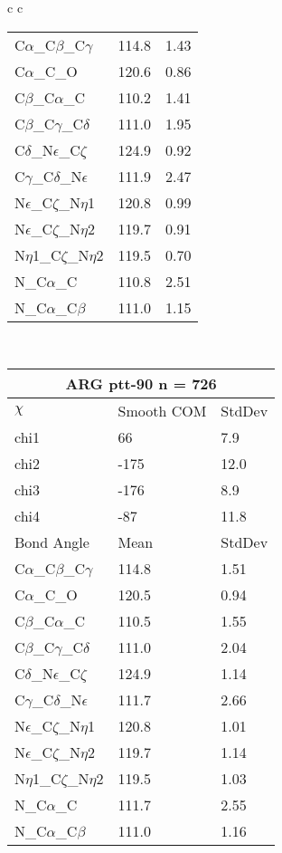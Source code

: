 \begin{longtable}{ c c }
\begin{tabular}{ l l l }
  C$\alpha$\_C$\beta$\_C$\gamma$ & 114.8 & 1.43\\
  C$\alpha$\_C\_O & 120.6 & 0.86\\
  C$\beta$\_C$\alpha$\_C & 110.2 & 1.41\\
  C$\beta$\_C$\gamma$\_C$\delta$ & 111.0 & 1.95\\
  C$\delta$\_N$\epsilon$\_C$\zeta$ & 124.9 & 0.92\\
  C$\gamma$\_C$\delta$\_N$\epsilon$ & 111.9 & 2.47\\
  N$\epsilon$\_C$\zeta$\_N$\eta$1 & 120.8 & 0.99\\
  N$\epsilon$\_C$\zeta$\_N$\eta$2 & 119.7 & 0.91\\
  N$\eta$1\_C$\zeta$\_N$\eta$2 & 119.5 & 0.70\\
  N\_C$\alpha$\_C & 110.8 & 2.51\\
  N\_C$\alpha$\_C$\beta$ & 111.0 & 1.15\\
  \bottomrule
  \end{tabular}
  \\
  \begin{tabular}{ l l l }
  \toprule
  \multicolumn{3}{c}{ARG \textbf{ptt-90} n = 726} \\ \toprule
  $\chi$       & Smooth COM & StdDev \\ \midrule
  chi1 & 66 & 7.9 \\ 
  chi2 & -175 & 12.0 \\ 
  chi3 & -176 & 8.9 \\ 
  chi4 & -87 & 11.8 \\ \midrule
  Bond Angle   & Mean     & StdDev \\ \midrule
  C$\alpha$\_C$\beta$\_C$\gamma$ & 114.8 & 1.51\\
  C$\alpha$\_C\_O & 120.5 & 0.94\\
  C$\beta$\_C$\alpha$\_C & 110.5 & 1.55\\
  C$\beta$\_C$\gamma$\_C$\delta$ & 111.0 & 2.04\\
  C$\delta$\_N$\epsilon$\_C$\zeta$ & 124.9 & 1.14\\
  C$\gamma$\_C$\delta$\_N$\epsilon$ & 111.7 & 2.66\\
  N$\epsilon$\_C$\zeta$\_N$\eta$1 & 120.8 & 1.01\\
  N$\epsilon$\_C$\zeta$\_N$\eta$2 & 119.7 & 1.14\\
  N$\eta$1\_C$\zeta$\_N$\eta$2 & 119.5 & 1.03\\
  N\_C$\alpha$\_C & 111.7 & 2.55\\
  N\_C$\alpha$\_C$\beta$ & 111.0 & 1.16\\

\end{tabular}
\end{longtable}
